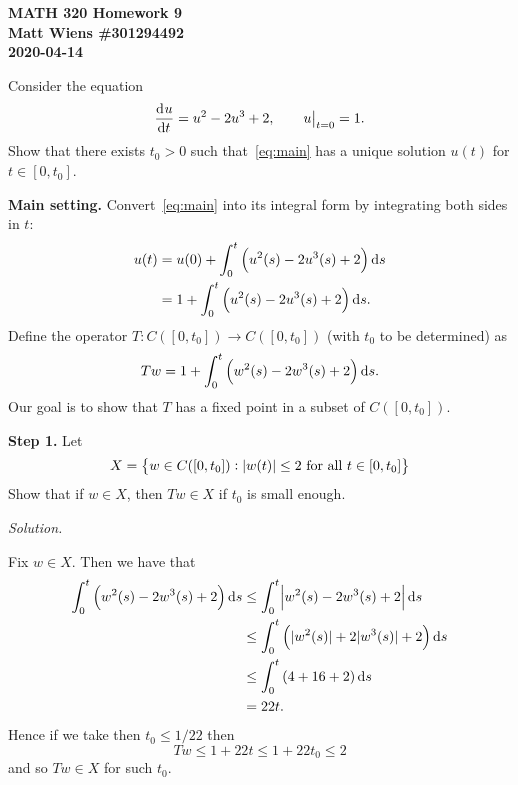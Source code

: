 \documentclass{article}
\begin{document}
\textbf{MATH 320 Homework 9} \\
\textbf{Matt Wiens \#301294492} \\
\textbf{2020-04-14}

Consider the equation
%
\begin{equation}
    \dod{u}{t} = u^2 - 2 u^3 + 2, \qquad \eval[1]{u}_{t = 0} = 1
    .
    \label{eq:main}
\end{equation}
%
Show that there exists $t_0 > 0$ such that~\eqref{eq:main}
has a unique solution $u(t)$ for $t \in [0, t_0]$.

\vspace{5mm}

\textbf{Main setting.} Convert~\eqref{eq:main} into its integral form by
integrating both sides in $t$:
%
\begin{align*}
    u(t) &= u(0) + \int_0^t \del{u^2(s) - 2 u^3(s) + 2} \dif s \\
         & = 1 + \int_0^t \del{u^2(s) - 2 u^3(s) + 2} \dif s
         .
\end{align*}
%
Define the operator $T: C([0, t_0]) \to C([0, t_0])$ (with $t_0$ to be
determined) as
%
\begin{equation*}
   Tw = 1 + \int_0^t \del{w^2(s) - 2 w^3(s) + 2} \dif s
   .
\end{equation*}
%
Our goal is to show that $T$ has a fixed point in a subset of $C([0,
t_0])$.

\newpage

\textbf{Step 1.}
Let
%
\begin{equation}
   X = \cbr{w \in C([0, t_0]):  |w(t)| \leq 2 \text{ for all $t \in [0, t_0]$}}
   \label{eq:x}
\end{equation}
%
Show that if $w \in X$, then $Tw \in X$ if $t_0$ is small enough.

\textit{Solution.}

Fix $w \in X$. Then we have that
%
\begin{align*}
    \int_0^{t} \del{w^2(s) - 2 w^3(s) + 2} \dif s
        &\leq \int_0^{t} \envert{w^2(s) - 2 w^3(s) + 2} \dif s \\
        &\leq \int_0^{t} \del{|w^2(s)| + 2 |w^3(s)| + 2} \dif s \\
        &\leq \int_0^{t} \del{4 + 16 + 2} \dif s \\
        &= 22 t
        .
\end{align*}
%
Hence if we take then $t_0 \leq 1 / 22$ then
%
\begin{equation*}
    T w \leq 1 + 22 t \leq 1 + 22 t_0 \leq 2
\end{equation*}
%
and so $T w \in X$ for such $t_0$.
\end{document}
